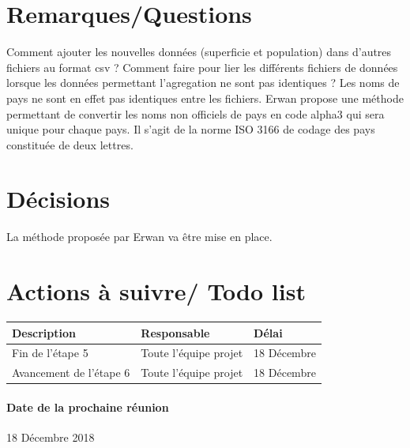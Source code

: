 \documentclass{article}
\begin{document}
\section{Remarques/Questions}
Comment ajouter les nouvelles données (superficie et population) dans d'autres fichiers au format csv ?
Comment faire pour lier les différents fichiers de données lorsque les données permettant l'agregation ne sont pas identiques ? 
Les noms de pays ne sont en effet pas identiques entre les fichiers. Erwan propose une méthode permettant de convertir les noms non officiels de pays en code alpha3 qui sera unique pour chaque pays. Il s'agit de la norme ISO 3166 de codage des pays constituée de deux lettres.
\section{Décisions}
La méthode proposée par Erwan va être mise en place.
\section{Actions à suivre/ Todo list}

\begin{tabular}{|C{5cm}|C{3cm}|C{3cm}|}
\hline {} Description & Responsable & Délai \\
\hline  Fin de l'étape 5  & Toute l'équipe projet  & 18 Décembre  \\
\hline 
Avancement de l'étape 6 & Toute l'équipe projet  & 18 Décembre \\
\hline
\end{tabular}

\paragraph{Date de la prochaine réunion}
18 Décembre 2018
\end{document}
